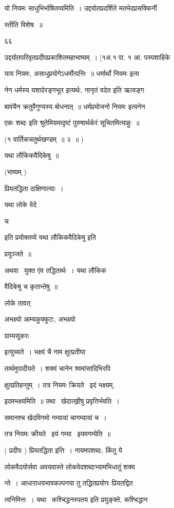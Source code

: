 \documentclass[11pt, openany]{book}
\begin{document}
यो नियमः साधुभिर्भाषितव्यमिति~। उद्दयोतप्रदर्शिते मतभेदप्रसक्किर्नी 

स्तीति विशेषः~॥ 

६६ 

उद्दयोतपरिवृतप्रदीपप्रकाशितमहाभाष्यम्~। [१अ.१ पा. १ आ. पस्पशाहिके 



याय नियमः, असाधुप्रयोगेऽधर्मोत्पत्तिः~॥ {\qt धर्मार्थो नियमः} इत्य \textendash\ 

नेन धर्मस्य यशादेरङ्गभूत इत्यर्थः, {\qt नानृतं वदेत} इति ऋत्वङ्ग \textendash\ 

बावंयैन क्रतुवैगुण्यस्य बोधनात्~॥ {\qt धर्मप्रयोजनो नियमः} इत्यनेन 

{\qt एकः शब्दः} इति श्रुतेमियमादृष्टं पुरुषार्थर्करं सूचितमित्याहुः~॥ 

(१ वार्तिकचतुर्थखण्डम्~॥ २~॥ ) 

यथा लौकिकवैदिकेषु~॥ 

(भाष्यम् ) 

प्रियतद्धिता दाक्षिणात्याः~। {\qt यथा लोके वेदे 

च} इति प्रयोक्तव्ये यथा {\qt लौकिकवैदिकेषु} इति 

प्रयुञ्जते~॥ 

अथवा \textendash\ युक्त एंव तद्धितार्थः~। यथा लौकिक \textendash\ 

वैदिकेषु च कृतान्तेषु~॥ 

लोके तावत् \textendash\ {\qt अभक्ष्यो आम्यकुक्कुटः, अभक्ष्यो 

ग्राम्यसूकरः} इत्युच्यते~। भक्ष्यं चै नाम क्षुत्प्रतीघा \textendash\ 

तार्थमुपादीयते~। शक्यं चानेन श्वमांसादिभिरपि 

क्षुत्प्रतिहन्तुम्~। तत्र नियमः क्रियते \textendash\ इदं भक्ष्यम्, 

इदमभक्ष्यमिति~॥ तथा \textendash\ खेदात्ख्रीषु प्रवृत्तिर्भवति~। 

समानश्च खेदविगमो गम्यायां चागम्यायां च~। 

तत्र नियमः क्रीयते \textendash\ इयं गम्या \textendash\ इयमगम्येति~॥ 

( प्रदीपः ) प्रियतद्धिता इत्ति~। नायमपशब्दः, किंतु ये 

लोकवैदयोर्सवा अवयवास्ते लोकवेदशब्दाभ्यामभिधातुं शक्य \textendash\ 

न्ते~। आधाराधयभावकल्पनया तु तद्धितप्रयोगः प्रियतद्वित \textendash\ 

त्वनिमित्तः~। यथा \textendash\ कश्चिद्धनस्पतय इति प्रयुङ्क्ते, कश्चिद्धान \textendash\ 
\end{document}
